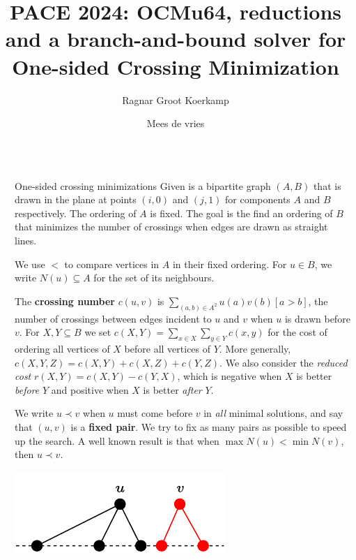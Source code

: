 \documentclass[final]{beamer}
\title{PACE 2024: OCMu64, reductions and a branch-and-bound solver for\\ One-sided Crossing Minimization}
\author{Ragnar {Groot Koerkamp} \inst{1} \and Mees de vries \inst{2}}
\institute[shortinst]{\inst{1} ETH Zurich, @curious\_coding \samelineand
  \inst{2} Unaffiliated, The Netherlands}
\newlength{\sepwidth}
\newlength{\colwidth}
\newcommand{\separatorcolumn}{\begin{column}{\sepwidth}\end{column}}
\theoremstyle{remark}
\renewcommand{\b}{\prec}
\begin{document}


\begin{frame}[t]
  \begin{columns}[t]
    \separatorcolumn
    \begin{column}{\colwidth}

      \begin{block}{One-sided crossing minimizations}
        Given is a bipartite graph $(A, B)$ that is drawn in the plane at points
        $(i, 0)$ and $(j,1)$ for components $A$ and $B$ respectively. The ordering of $A$
        is fixed. The goal is the find an ordering of $B$ that minimizes the number of
        crossings when edges are drawn as straight lines.

        We use $<$ to compare vertices in $A$ in their fixed ordering.
        For $u\in B$, we write $N(u) \subseteq A$ for the set of its neighbours.

        The \textbf{crossing number} $c(u, v)$ is $\sum_{(a, b) \in A^2}
        u(a)v(b)[a > b]$, the number of
        crossings between edges incident to $u$ and $v$ when $u$ is drawn before $v$.  For
        $X,Y\subseteq B$ we set $c(X,Y) = \sum_{x\in X}\sum_{y\in Y} c(x,y)$ for the cost of ordering
        all vertices of $X$ before all vertices of $Y$. More generally, $c(X,Y,Z) = c(X, Y) + c(X, Z) +
        c(Y, Z)$. We also consider the \emph{reduced cost} $r(X,Y) = c(X, Y) - c(Y, X)$, which is
        negative when $X$ is better \emph{before} $Y$ and positive when $X$ is better \emph{after} $Y$.

        We write $u\b v$ when $u$ must come before $v$ in \emph{all} minimal solutions, and say that $(u, v)$
        is a \textbf{fixed pair}.
        We try to fix as many pairs as possible to speed up the search.
        A well known result is that when $\max N(u) < \min N(v)$, then $u\b v$.

        \vspace{-1em}
        \centering
        \includegraphics[scale=2]{fig/simple.pdf}
      \end{block}


\end{column}
\end{columns}
\end{frame}
\end{document}
